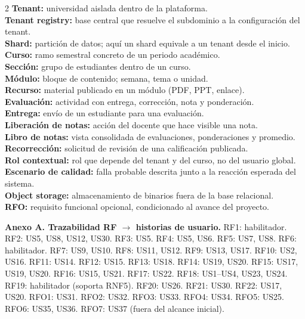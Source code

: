 \documentclass[letterpaper,10pt]{article}
\begin{document}
{\small
\begin{multicols}{2}
\textbf{Tenant:} universidad aislada dentro de la plataforma.\\
\textbf{Tenant registry:} base central que resuelve el subdominio a la configuración del tenant.\\
\textbf{Shard:} partición de datos; aquí un shard equivale a un tenant desde el inicio.\\
\textbf{Curso:} ramo semestral concreto de un periodo académico.\\
\textbf{Sección:} grupo de estudiantes dentro de un curso.\\
\textbf{Módulo:} bloque de contenido; semana, tema o unidad.\\
\textbf{Recurso:} material publicado en un módulo (PDF, PPT, enlace).\\
\textbf{Evaluación:} actividad con entrega, corrección, nota y ponderación.\\
\textbf{Entrega:} envío de un estudiante para una evaluación.\\
\textbf{Liberación de notas:} acción del docente que hace visible una nota.\\
\textbf{Libro de notas:} vista consolidada de evaluaciones, ponderaciones y promedio.\\
\textbf{Recorrección:} solicitud de revisión de una calificación publicada.\\
\textbf{Rol contextual:} rol que depende del tenant y del curso, no del usuario global.\\
\textbf{Escenario de calidad:} falla probable descrita junto a la reacción esperada del sistema.\\
\textbf{Object storage:} almacenamiento de binarios fuera de la base relacional.\\
\textbf{RFO:} requisito funcional opcional, condicionado al avance del proyecto.
\end{multicols}}

\textbf{Anexo A. Trazabilidad RF $\rightarrow$ historias de usuario.} RF1: habilitador. RF2: US5, US8, US12, US30. RF3: US5. RF4: US5, US6. RF5: US7, US8. RF6: habilitador. RF7: US9, US10. RF8: US11, US12. RF9: US13, US17. RF10: US2, US16. RF11: US14. RF12: US15. RF13: US18. RF14: US19, US20. RF15: US17, US19, US20. RF16: US15, US21. RF17: US22. RF18: US1--US4, US23, US24. RF19: habilitador (soporta RNF5). RF20: US26. RF21: US30. RF22: US17, US20. RFO1: US31. RFO2: US32. RFO3: US33. RFO4: US34. RFO5: US25. RFO6: US35, US36. RFO7: US37 (fuera del alcance inicial).
\end{document}
